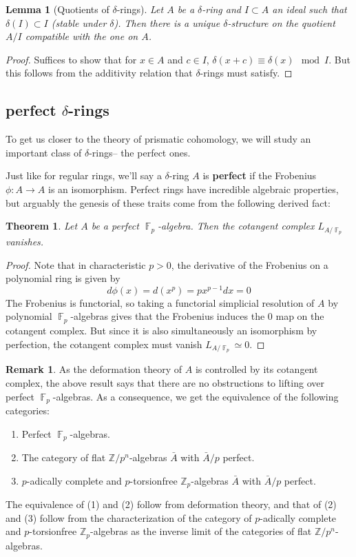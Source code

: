 \documentclass[12pt]{amsproc}
\newtheorem*{thm}{Theorem}
\newtheorem{lemma}{Lemma}
\theoremstyle{definition}
\newtheorem*{remark}{Remark}
\newcommand{\Z}{\mathbb{Z}}
\newcommand{\htpyeq}{\simeq}
\newcommand{\ra}{\rightarrow}
\DeclareMathOperator{\F}{\mathbb{F}}
\begin{document}
\begin{lemma}[Quotients of $\delta$-rings] Let $A$ be a $\delta$-ring and $I\subset A$ an ideal such that $\delta(I)\subset I$ (stable under $\delta$). Then there is a unique $\delta$-structure on the quotient $A/I$ compatible with the one on $A$.
\end{lemma}
\begin{proof} Suffices to show that for $x\in A$ and $c\in I$, $\delta(x+c)\equiv\delta(x)\mod{I}$. But this follows from the additivity relation that $\delta$-rings must satisfy.
\end{proof}

\subsection{perfect $\delta$-rings}
To get us closer to the theory of prismatic cohomology, we will study an important class of $\delta$-rings-- the perfect ones.

Just like for regular rings, we'll say a $\delta$-ring $A$ is \textbf{perfect} if the Frobenius $\phi:A\ra A$ is an isomorphism. Perfect rings have incredible algebraic properties, but arguably the genesis of these traits come from the following derived fact:

\begin{thm} Let $A$ be a perfect $\F_p$-algebra. Then the cotangent complex $L_{A/\F_p}$ vanishes. \end{thm}
\begin{proof} Note that in characteristic $p>0$, the derivative of the Frobenius on a polynomial ring is given by
\[	d\phi(x)=d(x^p)=px^{p-1}dx=0	\]
The Frobenius is functorial, so taking a functorial simplicial resolution of $A$ by polynomial $\F_p$-algebras gives that the Frobenius induces the 0 map on the cotangent complex. But since it is also simultaneously an isomorphism by perfection, the cotangent complex must vanish $L_{A/\F_p}\htpyeq 0$.
\end{proof}

\begin{remark} As the deformation theory of $A$ is controlled by its cotangent complex, the above result says that there are no obstructions to lifting over perfect $\F_p$-algebras. As a consequence, we get the equivalence of the following categories:
\begin{enumerate}
\item Perfect $\F_p$-algebras.
\item The category of flat $\Z/p^n$-algebras $\bar{A}$ with $\bar{A}/p$ perfect.
\item $p$-adically complete and $p$-torsionfree $\Z_p$-algebras $\bar{A}$ with $\bar{A}/p$ perfect.
\end{enumerate}
The equivalence of (1) and (2) follow from deformation theory, and that of (2) and (3) follow from the characterization of the category of $p$-adically complete and $p$-torsionfree $\Z_p$-algebras as the inverse limit of the categories of flat $\Z/p^n$-algebras.
\end{remark}
\end{document}

